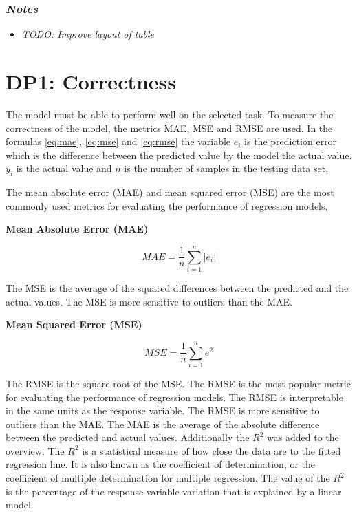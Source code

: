 \subsubsection*{\textit{Notes}}

\begin{itemize}
    \item \textit{TODO: Improve layout of table}
\end{itemize}


\section{DP1: Correctness}\label{sec:dp2:-correctness}
The model must be able to perform well on the selected task.
To measure the correctness of the model, the metrics MAE, MSE and RMSE are used.
In the formulas \ref{eq:mae}, \ref{eq:mse} and \ref{eq:rmse} the variable
$e_i$ is the prediction
error which is the difference between the predicted value by the model the
actual value.
$y_i$ is the actual value and $n$ is the number of samples in the testing
data set.

The mean absolute error (MAE) and mean squared error (MSE) are the most
commonly used metrics for
evaluating the performance of regression models.

\textbf{Mean Absolute Error (MAE)}
\begin{tcolorbox}[arc=0pt,boxrule=0.5pt]
    \begin{equation}
        \label{eq:mae}
        MAE = \frac{1}{n} \sum_{i=1}^{n} |e_i|
    \end{equation}
\end{tcolorbox}

The MSE is the average of the squared differences between the predicted and
the actual values.
The MSE is more sensitive to outliers than the MAE.

\textbf{Mean Squared Error (MSE)}

\begin{tcolorbox}[arc=0pt,boxrule=0.5pt]
    \begin{equation}
        \label{eq:mse}
        MSE = \frac{1}{n} \sum_{i=1}^{n} e^2
    \end{equation}
\end{tcolorbox}

The RMSE is the square root of the MSE. The RMSE is the most popular metric
for evaluating the
performance of regression models. The RMSE is interpretable in the same units
as the response
variable. The RMSE is more sensitive to outliers than the MAE.
The MAE is the average of the absolute difference between the predicted and
actual values.
Additionally the $R^2$ was added to the overview. The $R^2$ is a statistical
measure of how close
the data are to the fitted regression line. It is also known as the
coefficient of determination,
or the coefficient of multiple determination for multiple regression. The
value of the $R^2$ is
the percentage of the response variable variation that is explained by a
linear model.

